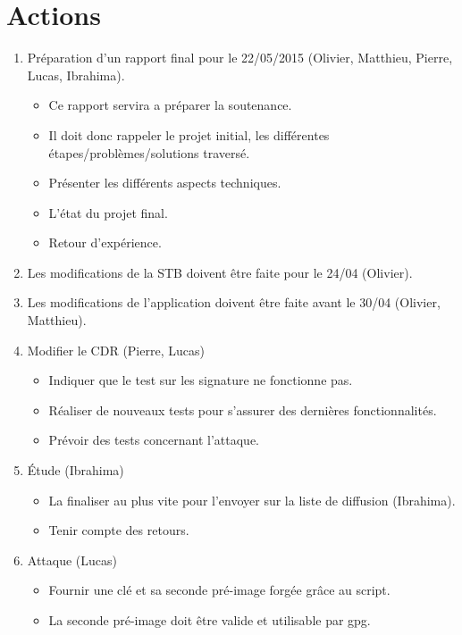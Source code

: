 \documentclass{CR-projet}
\begin{document}
\section{Actions}

\begin{enumerate}
	\item Préparation d'un rapport final pour le 22/05/2015 (Olivier, Matthieu, Pierre, Lucas, Ibrahima).
	\begin{itemize}
		\item Ce rapport servira a préparer la soutenance.
		\item Il doit donc rappeler le projet initial, les différentes étapes/problèmes/solutions traversé.
		\item Présenter les différents aspects techniques.
		\item L'état du projet final.
		\item Retour d'expérience.
	\end{itemize}
	\item Les modifications de la STB doivent être faite pour le 24/04 (Olivier).
	\item Les modifications de l'application doivent être faite avant le 30/04 (Olivier, Matthieu).
	\item Modifier le CDR (Pierre, Lucas)
	\begin{itemize}
		\item Indiquer que le test sur les signature ne fonctionne pas.
		\item Réaliser de nouveaux tests pour s'assurer des dernières fonctionnalités.
		\item Prévoir des tests concernant l'attaque.
	\end{itemize}
	\item Étude (Ibrahima)
	\begin{itemize}
		\item La finaliser au plus vite pour l'envoyer sur la liste de diffusion (Ibrahima).
		\item Tenir compte des retours.
	\end{itemize}
	\item Attaque (Lucas)
	\begin{itemize}
		\item Fournir une clé et sa seconde pré-image forgée grâce au script.
		\item La seconde pré-image doit être valide et utilisable par gpg.
	\end{itemize}
\end{enumerate}
\end{document}
